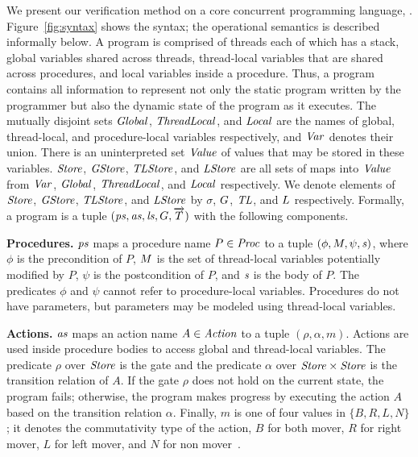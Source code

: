 We present our verification method on a core concurrent programming language, \civl.
Figure~\ref{fig:syntax} shows the syntax;  the operational semantics is described informally below.
A \civl program is comprised of threads each of which has a stack, global variables shared across threads, 
thread-local variables that are shared across procedures, and local variables inside a procedure.
Thus, a program contains all information to represent not only the static program 
written by the programmer but also the dynamic state of the program as it executes.
The mutually disjoint sets $\mathit{Global}$, $\mathit{ThreadLocal}$, and $\mathit{Local}$ are the names of global, thread-local, and procedure-local variables 
respectively, and $\mathit{Var}$ denotes their union.
There is an uninterpreted set $\mathit{Value}$ of values that may be stored in these variables.
$\mathit{Store}$, $\mathit{GStore}$, $\mathit{TLStore}$, and $\mathit{LStore}$ are all sets of maps into $\mathit{Value}$
from $\mathit{Var}$, $\mathit{Global}$, $\mathit{ThreadLocal}$, and $\mathit{Local}$ respectively.
We denote elements of $\mathit{Store}$, $\mathit{GStore}$, $\mathit{TLStore}$, and $\mathit{LStore}$
by $\sigma$, $G$, $\mathit{TL}$, and $L$ respectively.
Formally, a \civl program is a tuple $(\mathit{ps}, \mathit{as}, \mathit{ls}, G, \overrightarrow{T})$ with the following components.

\noindent
{\bf Procedures.}
$\mathit{ps}$ maps a procedure name $P \in \mathit{Proc}$ to a tuple $(\phi, M, \psi, \mathit{s})$, 
where $\phi$ is the precondition of $P$, $M$ is the set of thread-local variables potentially modified by $P$, 
$\psi$ is the postcondition of $P$, and $\mathit{s}$ is the body of $P$.
The predicates $\phi$ and $\psi$ cannot refer to procedure-local variables.
Procedures do not have parameters, but parameters may be modeled using thread-local variables.

\noindent
{\bf Actions.}
$\mathit{as}$ maps an action name $A \in \mathit{Action}$ to a tuple $(\rho,\alpha,m)$.
Actions are used inside procedure bodies to access global and thread-local variables.
The predicate $\rho$ over $\mathit{Store}$ is the gate and the predicate $\alpha$ over $\mathit{Store} \times \mathit{Store}$ 
is the transition relation of $A$.
If the gate $\rho$ does not hold on the current state, the program fails;
otherwise, the program makes progress by executing the action $A$ based on the transition relation $\alpha$.
Finally, $m$ is one of four values in $\{B,R,L,N\}$;
it denotes the commutativity type of the action, $B$ for both mover, $R$ for right mover, $L$ for left mover, 
and $N$ for non mover~\cite{FlanaganFLQ08}. 

